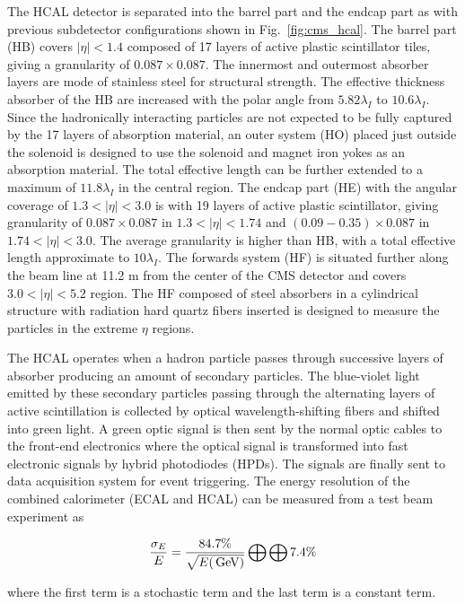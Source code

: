 The HCAL detector is separated into the barrel part and the endcap part as with previous subdetector configurations shown in Fig.~\ref{fig:cms_hcal}.
The barrel part (HB) covers $|\eta|<1.4$ composed of 17 layers of active plastic scintillator tiles, giving a granularity of $0.087 \times 0.087$.
The innermost and outermost absorber layers are mode of stainless steel for structural strength.
The effective thickness absorber of the HB are increased with the polar angle from $5.82 \lambda_I$ to $10.6 \lambda_I$.
Since the hadronically interacting particles are not expected to be fully captured by the 17 layers of absorption material, an outer system (HO) placed just outside the solenoid is designed to use the solenoid and magnet iron yokes as an absorption material.
The total effective length can be further extended to a maximum of $11.8 \lambda_I$ in the central region.
The endcap part (HE) with the angular coverage of $1.3 < |\eta| < 3.0$ is with 19 layers of active plastic scintillator, giving granularity of $0.087 \times 0.087$ in $1.3 < |\eta| < 1.74$ and $(0.09 - 0.35) \times 0.087$ in $1.74 < |\eta| < 3.0$.
The average granularity is higher than HB, with a total effective length approximate to $10 \lambda_I$.
The forwards system (HF) is situated further along the beam line at 11.2 m from the center of the CMS detector and covers $3.0 < |\eta| < 5.2$ region.
The HF composed of steel absorbers in a cylindrical structure with radiation hard quartz fibers inserted is designed to measure the particles in the extreme $\eta$ regions.

The HCAL operates when a hadron particle passes through successive layers of absorber producing an amount of secondary particles.
The blue-violet light emitted by these secondary particles passing through the alternating layers of active scintillation is collected by optical wavelength-shifting fibers and shifted into green light.
A green optic signal is then sent by the normal optic cables to the front-end electronics where the optical signal is transformed into fast electronic signals by hybrid photodiodes (HPDs).
The signals are finally sent to data acquisition system for event triggering.
The energy resolution of the combined calorimeter (ECAL and HCAL) can be measured from a test beam experiment as
\begin{linenomath}\begin{equation}\label{eq:cms_resol}
    \frac{\sigma_E}{E} = \frac{84.7\%}{\sqrt{E(\,\text{Ge\hspace{-.08em}V})}} \bigoplus \bigoplus 7.4\%
\end{equation}\end{linenomath}
where the first term is a stochastic term and the last term is a constant term.

